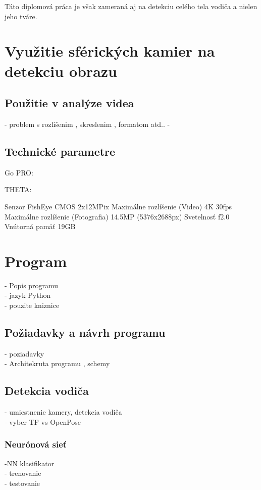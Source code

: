 \documentclass[slovak,master,dept460,male,cpp,cpdeclaration]{diploma}
\begin{document}
 Táto diplomová práca je však zameraná aj na detekciu celého tela vodiča a nielen jeho tváre. 







\newpage
\section{Využitie sférických kamier na detekciu obrazu}
\label{sec:Spherical cameras}

\newpage
\subsection{Použitie v analýze videa}
- problem s rozlišenim , skreslenim , formatom atd.. 
- 


\subsection{Technické parametre}
Go PRO:

THETA:

Senzor	FishEye CMOS 2x12MPix
Maximálne rozlíšenie (Video)	4K  30fps
Maximálne rozlíšenie (Fotografia)	14.5MP (5376x2688px)
Svetelnosť	f2.0
Vnútorná pamäť	19GB

\newpage
\section{Program}
\label{sec:Program}
- Popis programu\\
- jazyk Python\\
- pouzite kniznice\\


\newpage
\subsection{Požiadavky a návrh programu}
- poziadavky \\
- Architekruta programu , schemy


\newpage
\subsection{Detekcia vodiča}
- umiestnenie kamery, detekcia vodiča\\
 - vyber TF vs OpenPose



\newpage
\subsubsection{Neurónová sieť}
-NN klasifikator\\
- trenovanie \\
- testovanie
\end{document}
